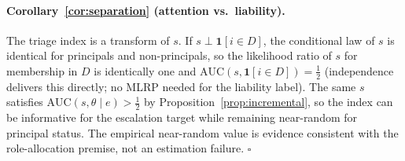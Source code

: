 \paragraph{Corollary~\ref{cor:separation} (attention vs.\ liability).}
The triage index is a transform of $s$. If
$s\perp\mathbf{1}[i\in D]$, the conditional law of $s$ is identical
for principals and non-principals, so the likelihood ratio of $s$
for membership in $D$ is identically one and
$\mathrm{AUC}(s,\mathbf{1}[i\in D])=\tfrac12$ (independence
delivers this directly; no MLRP needed for the liability label).
The same $s$ satisfies $\mathrm{AUC}(s,\theta\mid e)>\tfrac12$ by
Proposition~\ref{prop:incremental}, so the index can be
informative for the escalation target while remaining near-random
for principal status. The empirical near-random value is evidence
consistent with the role-allocation premise, not an estimation
failure. \hfill$\square$
